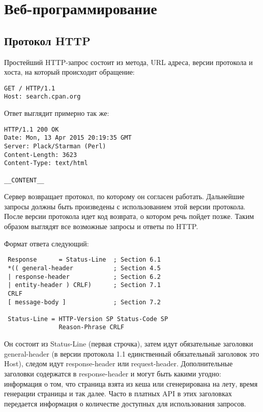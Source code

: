 \setcounter{chapter}{7}
\chapter{Веб-программирование}
\section{Протокол HTTP}
Простейший HTTP-запрос состоит из метода, URL адреса, версии протокола и хоста, на который происходит обращение:
\begin{verbatim}
GET / HTTP/1.1
Host: search.cpan.org
\end{verbatim}
Ответ выглядит примерно так же:
\begin{verbatim}
HTTP/1.1 200 OK
Date: Mon, 13 Apr 2015 20:19:35 GMT
Server: Plack/Starman (Perl)
Content-Length: 3623
Content-Type: text/html

__CONTENT__
\end{verbatim}
Сервер возвращает протокол, по которому он согласен работать. Дальнейшие запросы должны быть произведены с использованием этой версии протокола. После версии протокола идет код возврата, о котором речь пойдет позже. Таким образом выглядят все возможные запросы и ответы по HTTP.

Формат ответа следующий:
\begin{verbatim}
 Response      = Status-Line  ; Section 6.1
 *(( general-header           ; Section 4.5
 | response-header            ; Section 6.2
 | entity-header ) CRLF)      ; Section 7.1
 CRLF
 [ message-body ]             ; Section 7.2

 Status-Line = HTTP-Version SP Status-Code SP
               Reason-Phrase CRLF
\end{verbatim}
Он состоит из Status-Line (первая строчка), затем идут обязательные заголовки general-header (в версии протокола 1.1 единственный обязательный заголовок это Host), следом идут response-header или request-header. Дополнительные заголовки содержатся в response-header и могут быть какими угодно: информация о том, что страница взята из кеша или сгенерирована на лету, время генерации страницы и так далее. Часто в платных API в этих заголовках передается информация о количестве доступных для использования запросов.

